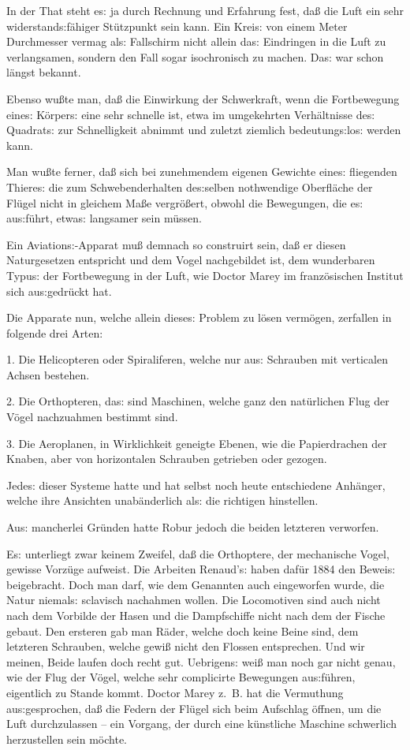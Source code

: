 \documentclass[oneside,12pt]{book}
\newcommand{\s}{s:}
\begin{document}
In der That steht e{\s} ja durch Rechnung und Erfahrung fest, da{\ss}
die Luft ein sehr widerstand{\s}f\"ahiger St\"utzpunkt sein kann. Ein
Krei{\s} von einem Meter Durchmesser vermag al{\s} Fallschirm nicht
allein da{\s} Eindringen in die Luft zu verlangsamen, sondern den
Fall sogar isochronisch zu machen. Da{\s} war schon l\"angst bekannt.

Ebenso wu{\ss}te man, da{\ss} die Einwirkung der Schwerkraft, wenn
die Fortbewegung eine{\s} K\"orper{\s} eine sehr schnelle ist, etwa
im umgekehrten Verh\"altnisse de{\s} Quadrat{\s} zur Schnelligkeit
abnimmt und zuletzt ziemlich bedeutung{\s}lo{\s} werden kann.

Man wu{\ss}te ferner, da{\ss} sich bei zunehmendem eigenen Gewichte
eine{\s} fliegenden Thiere{\s} die zum Schwebenderhalten de{\s}selben
nothwendige Oberfl\"ache der Fl\"ugel nicht in gleichem Ma{\ss}e
vergr\"o{\ss}ert, obwohl die Bewegungen, die e{\s} au{\s}f\"uhrt,
etwa{\s} langsamer sein m\"ussen.

Ein Aviation{\s}-Apparat mu{\ss} demnach so construirt sein, da{\ss}
er diesen Naturgesetzen entspricht und dem Vogel nachgebildet ist,
{\glqq}dem wunderbaren Typu{\s} der Fortbewegung in der Luft{\grqq},
wie Doctor Marey im franz\"osischen Institut sich au{\s}gedr\"uckt
hat.

Die Apparate nun, welche allein diese{\s} Problem zu l\"osen
verm\"ogen, zerfallen in folgende drei Arten:

1. Die Helicopteren oder Spiraliferen, welche nur au{\s} Schrauben
mit verticalen Achsen bestehen.

2. Die Orthopteren, da{\s} sind Maschinen, welche ganz den
nat\"urlichen Flug der V\"ogel nachzuahmen bestimmt sind.

3. Die Aeroplanen, in Wirklichkeit geneigte Ebenen, wie die
Papierdrachen der Knaben, aber von horizontalen Schrauben getrieben
oder gezogen.

Jede{\s} dieser Systeme hatte und hat selbst noch heute entschiedene
Anh\"anger, welche ihre Ansichten unab\"anderlich al{\s} die
richtigen hinstellen.

Au{\s} mancherlei Gr\"unden hatte Robur jedoch die beiden letzteren
verworfen.

E{\s} unterliegt zwar keinem Zweifel, da{\ss} die Orthoptere, der
mechanische Vogel, gewisse Vorz\"uge aufweist. Die Arbeiten
Renaud'{\s} haben daf\"ur 1884 den Bewei{\s} beigebracht. Doch man
darf, wie dem Genannten auch eingeworfen wurde, die Natur niemal{\s}
sclavisch nachahmen wollen. Die Locomotiven sind auch nicht nach dem
Vorbilde der Hasen und die Dampfschiffe nicht nach dem der Fische
gebaut. Den ersteren gab man R\"ader, welche doch keine Beine sind,
dem letzteren Schrauben, welche gewi{\ss} nicht den Flossen
entsprechen. Und wir meinen, Beide laufen doch recht gut.
Uebrigen{\s} wei{\ss} man noch gar nicht genau, wie der Flug der
V\"ogel, welche sehr complicirte Bewegungen au{\s}f\"uhren,
eigentlich zu Stande kommt. Doctor Marey z.~B. hat die Vermuthung
au{\s}gesprochen, da{\ss} die Federn der Fl\"ugel sich beim Aufschlag
\"offnen, um die Luft durchzulassen -- ein Vorgang, der durch eine
k\"unstliche Maschine schwerlich herzustellen sein m\"ochte.
\end{document}
